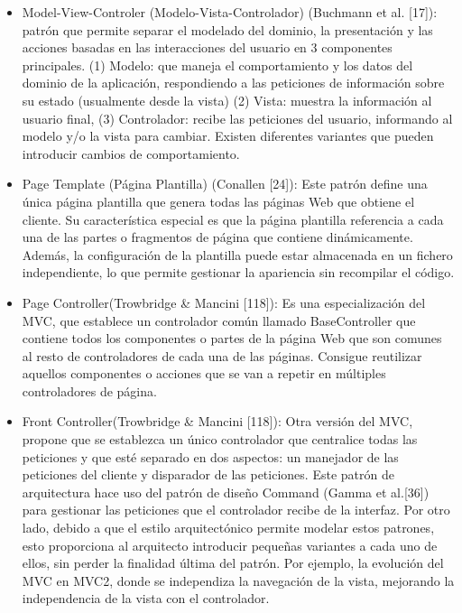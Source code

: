 \begin{itemize}
  
\item Model-View-Controler (Modelo-Vista-Controlador) (Buchmann et al. [17]):
patrón que permite separar el modelado del dominio, la
presentación y las acciones basadas en las interacciones del usuario en 3
componentes principales. (1) Modelo: que maneja el comportamiento y
los datos del dominio de la aplicación, respondiendo a las peticiones de
información sobre su estado (usualmente desde la vista) (2) Vista: muestra
la información al usuario final, (3) Controlador: recibe las peticiones del
usuario, informando al modelo y/o la vista para cambiar. Existen
diferentes variantes que pueden introducir cambios de comportamiento.


\item  Page Template (Página Plantilla) (Conallen [24]): Este patrón define
una única página plantilla que genera todas las páginas Web que obtiene
el cliente. Su característica especial es que la página plantilla referencia a
cada una de las partes o fragmentos de página que contiene
dinámicamente. Además, la configuración de la plantilla puede estar
almacenada en un fichero independiente, lo que permite gestionar la
apariencia sin recompilar el código.

\item Page Controller(Trowbridge \& Mancini [118]): Es una especialización
del MVC, que establece un controlador común llamado BaseController
que contiene todos los componentes o partes de la página Web que son
comunes al resto de controladores de cada una de las páginas. Consigue
reutilizar aquellos componentes o acciones que se van a repetir en
múltiples controladores de página.

\item Front Controller(Trowbridge \& Mancini [118]): Otra versión del MVC,
propone que se establezca un único controlador que centralice todas las
peticiones y que esté separado en dos aspectos: un manejador de las
peticiones del cliente y disparador de las peticiones. Este patrón de
arquitectura hace uso del patrón de diseño Command (Gamma et al.[36])
para gestionar las peticiones que el controlador recibe de la interfaz.
Por otro lado, debido a que el estilo arquitectónico permite modelar estos
patrones, esto proporciona al arquitecto introducir pequeñas variantes a cada
uno de ellos, sin perder la finalidad última del patrón. Por ejemplo, la
evolución del MVC en MVC2, donde se independiza la navegación de la vista,
mejorando la independencia de la vista con el controlador.

\end{itemize}



